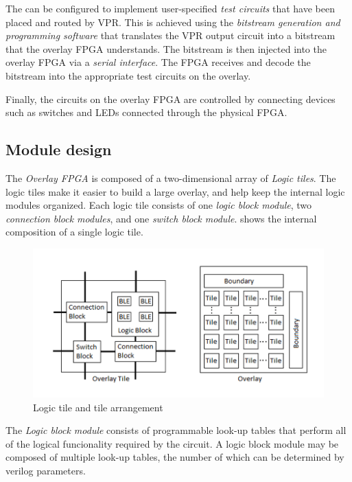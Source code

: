 The \overlay can be configured to implement user-specified \emph{test circuits} that have been placed and routed by VPR.
This is achieved using the \emph{bitstream generation and programming software} that translates the VPR output circuit into a bitstream that the overlay FPGA understands.
The bitstream is then injected into the overlay FPGA via a \emph{serial interface}.
The FPGA receives and decode the bitstream into the appropriate test circuits on the overlay.

Finally, the circuits on the overlay FPGA are controlled by connecting devices such as switches and LEDs connected through the physical FPGA.



\subsection{Module design}

The \emph{Overlay FPGA} is composed of a two-dimensional array of \emph{Logic tiles}.
The logic tiles make it easier to build a large overlay, and help keep the internal 
logic modules organized.
Each logic tile consists of one \emph{logic block module}, two \emph{connection block modules}, 
and one \emph{switch block module}.
 shows the internal composition of a single logic tile.

\begin{figure}[!h]
	\centering
	\includegraphics[scale=0.7]{overlay.png}
	\caption{Logic tile and tile arrangement}
	\label{tile-diagram}
\end{figure}

The \emph{Logic block module} consists of programmable look-up tables that perform all of the logical 
funcionality required by the circuit.
A logic block module may be composed of multiple look-up tables, the number of which 
can be determined by verilog parameters.

